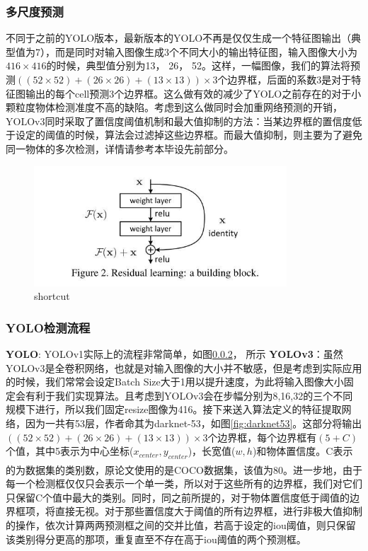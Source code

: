\documentclass[12pt,a4paper,titlepage]{article}
\newcommand{\upcite}[1]{\textsuperscript{\textsuperscript{\cite{#1}}}}  %
\begin{document}
\subsubsection{多尺度预测}
不同于之前的YOLO版本，最新版本的YOLO不再是仅仅生成一个特征图输出（典型值为7），而是同时对输入图像生成3个不同大小的输出特征图，输入图像大小为$416\times 416$的时候，典型值分别为13， 26， 52。这样，一幅图像，我们的算法将预测$((52\times 52)+(26\times 26)+(13\times 13))\times 3$个边界框，后面的系数3是对于特征图输出的每个cell预测3个边界框。这么做有效的减少了YOLO之前存在的对于小颗粒度物体检测准度不高的缺陷。考虑到这么做同时会加重网络预测的开销，YOLOv3同时采取了置信度阈值机制和最大值抑制的方法：当某边界框的置信度低于设定的阈值的时候，算法会过滤掉这些边界框。而最大值抑制，则主要为了避免同一物体的多次检测，详情请参考本毕设先前部分。

\begin{figure}[h]
\centering
\includegraphics[height=4.5cm]{img/shortcut.jpg}
\caption{shortcut}
\label{fig:shortcut}
\end{figure}

\subsubsection{YOLO检测流程}
\textbf{YOLO}:  YOLOv1实际上的流程非常简单，如图\ref{}， 所示
\textbf{YOLOv3}：虽然YOLOv3是全卷积网络，也就是对输入图像的大小并不敏感，但是考虑到实际应用的时候，我们常常会设定Batch Size大于1用以提升速度，为此将输入图像大小固定会有利于我们实现算法。且考虑到YOLOv3会在步幅分别为8,16,32的三个不同规模下进行，所以我们固定resize图像为416。接下来送入算法定义的特征提取网络，因为一共有53层，作者命其为darknet-53，如图\ref{fig:darknet53}。这部分将输出$((52\times 52)+(26\times 26)+(13\times 13))\times 3$个边界框，每个边界框有$(5+C)$个值，其中5表示为中心坐标($x_{center}, y_{center}$)，长宽值($w, h$)和物体置信度。C表示的为数据集的类别数，原论文使用的是COCO\upcite{}数据集，该值为80。进一步地，由于每一个检测框仅仅只会表示一个单一类，所以对于这些所有的边界框，我们对它们只保留C个值中最大的类别。同时，同之前所提的，对于物体置信度低于阈值的边界框项，将直接无视。对于那些置信度大于阈值的所有边界框，进行非极大值抑制的操作，依次计算两两预测框之间的交并比值，若高于设定的iou阈值，则只保留该类别得分更高的那项，重复直至不存在高于iou阈值的两个预测框。
\end{document}
